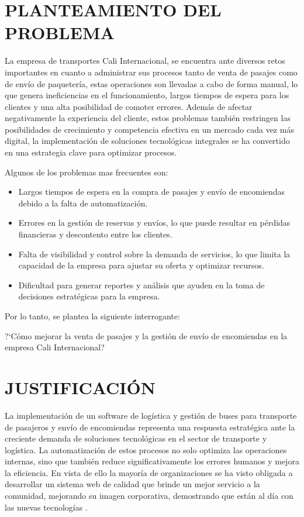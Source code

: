 \section{PLANTEAMIENTO DEL PROBLEMA}

	La empresa de transportes Cali Internacional, se encuentra ante diversos retos importantes en cuanto a administrar sus procesos tanto de venta de pasajes como de envío de paquetería, estas operaciones son llevadas a cabo de forma manual, lo que genera ineficiencias en el funcionamiento, largos tiempos de espera para los clientes y una alta posibilidad de comoter errores. Además de afectar negativamente la experiencia del cliente, estos problemas también restringen las posibilidades de crecimiento y competencia efectiva en un mercado cada vez más digital, la implementación de soluciones tecnológicas integrales se ha convertido en una estrategia clave para optimizar procesos.  
	
	Algunos de los problemas mas frecuentes son:
	
	\begin{itemize}[label=$\bullet$, left=1.25cm, labelsep = 0.75cm, topsep = 0pt, parsep = 0pt]
		\item Largos tiempos de espera en la compra de pasajes y envío de encomiendas debido a la falta de automatización.
		\item Errores en la gestión de reservas y envíos, lo que puede resultar en pérdidas financieras y descontento entre los clientes.
		\item Falta de visibilidad y control sobre la demanda de servicios, lo que limita la capacidad de la empresa para ajustar su oferta y optimizar recursos.
		\item Dificultad para generar reportes y análisis que ayuden en la toma de decisiones estratégicas para la empresa.    
	\end{itemize}
	
	Por lo tanto, se plantea la siguiente interrogante:
	
	?`Cómo mejorar la venta de pasajes y la gestión de envío de encomiendas en la empresa Cali Internacional?
	
\section{JUSTIFICACIÓN}

	La implementación de un software de logística y gestión de buses para transporte de pasajeros y envío de encomiendas representa una respuesta estratégica ante la creciente demanda de soluciones tecnológicas en el sector de transporte y logística. La automatización de estos procesos no solo optimiza las operaciones internas, sino que también reduce significativamente los errores humanos y mejora la eficiencia. En vista de ello la mayoría de organizaciones se ha visto obligada a desarrollar un sistema web de calidad que brinde un mejor servicio a la comunidad, mejorando su imagen corporativa, demostrando que están al día con las nuevas tecnologías \parencite{nunez2005diseno}.
	
